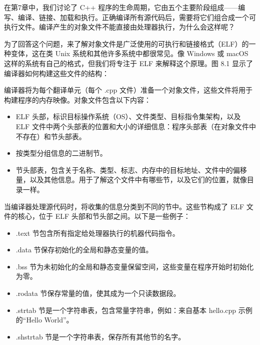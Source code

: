 在第7章中，我们讨论了 C++ 程序的生命周期，它由五个主要阶段组成——编写、编译、链接、加载和执行。正确编译所有源代码后，需要将它们组合成一个可执行文件。编译产生的对象文件不能直接由处理器执行，为什么会这样呢？

为了回答这个问题，来了解对象文件是广泛使用的可执行和链接格式（ELF）的一种变体，这在类 Unix 系统和其他许多系统中都很常见。像 Windows 或 macOS 这样的系统有自己的格式，但我们将专注于 ELF 来解释这个原理。图 8.1 显示了编译器如何构建这些文件的结构：


编译器将为每个翻译单元（每个 .cpp 文件）准备一个对象文件，这些文件将用于构建程序的内存映像。对象文件包含以下内容：

\begin{itemize}
\item
ELF 头部，标识目标操作系统（OS）、文件类型、目标指令集架构，以及 ELF 文件中两个头部表的位置和大小的详细信息：程序头部表（在对象文件中不存在）和节头部表。

\item
按类型分组信息的二进制节。

\item
节头部表，包含关于名称、类型、标志、内存中的目标地址、文件中的偏移量，以及其他信息。用于了解这个文件中有哪些节，以及它们的位置，就像目录一样。
\end{itemize}

当编译器处理源代码时，将收集的信息分类到不同的节中。这些节构成了 ELF 文件的核心，位于 ELF 头部和节头部之间。以下是一些例子：

\begin{itemize}
\item
.text 节包含所有指定给处理器执行的机器代码指令。

\item
.data 节保存初始化的全局和静态变量的值。

\item
.bss 节为未初始化的全局和静态变量保留空间，这些变量在程序开始时初始化为零。

\item
.rodata 节保存常量的值，使其成为一个只读数据段。

\item
.strtab 节是一个字符串表，包含常量字符串，例如：来自基本 hello.cpp 示例的“Hello World”。

\item
.shstrtab 节是一个字符串表，保存所有其他节的名字。
\end{itemize}

